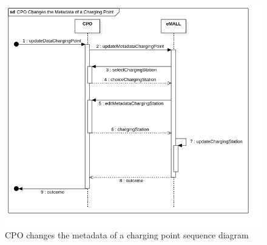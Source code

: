 \begin{center}
    \begin{figure} [H]
        \begin{center}
            \includegraphics[width=0.9\linewidth]{Images/SequenceDiagrams/cpo_changes_the_metadata_of_a_charging_point}
            \caption{CPO changes the metadata of a charging point sequence diagram}
            \label{fig: cpo_updates_metadata_point_seq_diag}
        \end{center}
    \end{figure}
\end{center}

